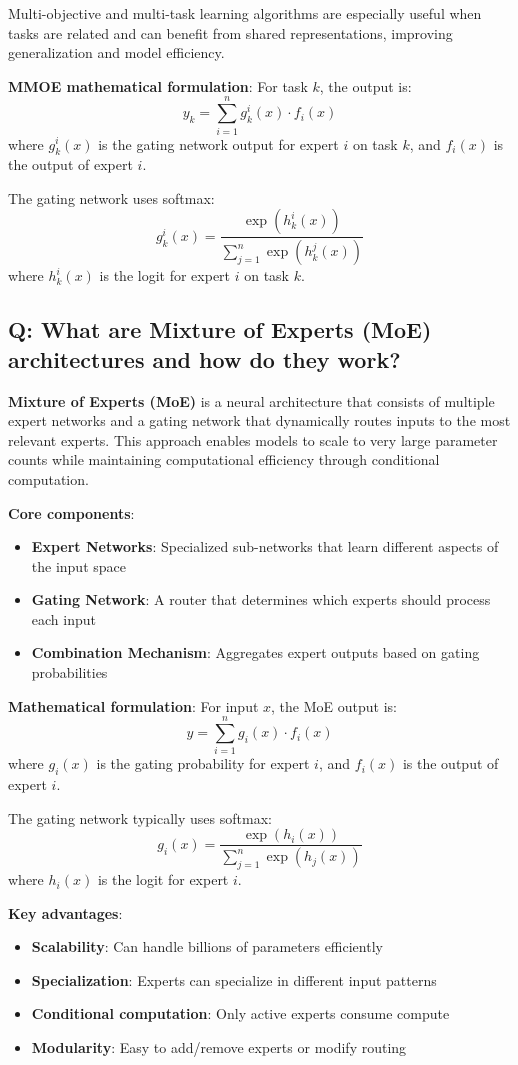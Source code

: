 Multi-objective and multi-task learning algorithms are especially useful when tasks are related and can benefit from shared representations, improving generalization and model efficiency.

\textbf{MMOE mathematical formulation}:
For task \(k\), the output is:
\[
	y_k = \sum_{i=1}^{n} g_k^i(x) \cdot f_i(x)
\]
where \(g_k^i(x)\) is the gating network output for expert \(i\) on task \(k\), and \(f_i(x)\) is the output of expert \(i\).

The gating network uses softmax:
\[
	g_k^i(x) = \frac{\exp(h_k^i(x))}{\sum_{j=1}^{n} \exp(h_k^j(x))}
\]
where \(h_k^i(x)\) is the logit for expert \(i\) on task \(k\).

\subsection*{Q: What are Mixture of Experts (MoE) architectures and how do they work?}
\textbf{Mixture of Experts (MoE)} is a neural architecture that consists of multiple expert networks and a gating network that dynamically routes inputs to the most relevant experts. This approach enables models to scale to very large parameter counts while maintaining computational efficiency through conditional computation.

\textbf{Core components}:
\begin{itemize}
	\item \textbf{Expert Networks}: Specialized sub-networks that learn different aspects of the input space
	\item \textbf{Gating Network}: A router that determines which experts should process each input
	\item \textbf{Combination Mechanism}: Aggregates expert outputs based on gating probabilities
\end{itemize}

\textbf{Mathematical formulation}:
For input \(x\), the MoE output is:
\[
	y = \sum_{i=1}^{n} g_i(x) \cdot f_i(x)
\]
where \(g_i(x)\) is the gating probability for expert \(i\), and \(f_i(x)\) is the output of expert \(i\).

The gating network typically uses softmax:
\[
	g_i(x) = \frac{\exp(h_i(x))}{\sum_{j=1}^{n} \exp(h_j(x))}
\]
where \(h_i(x)\) is the logit for expert \(i\).

\textbf{Key advantages}:
\begin{itemize}
	\item \textbf{Scalability}: Can handle billions of parameters efficiently
	\item \textbf{Specialization}: Experts can specialize in different input patterns
	\item \textbf{Conditional computation}: Only active experts consume compute
	\item \textbf{Modularity}: Easy to add/remove experts or modify routing
\end{itemize}

